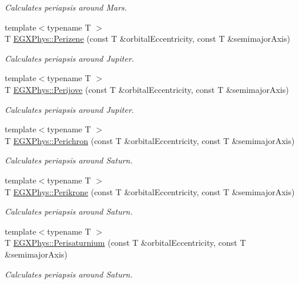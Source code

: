 \begin{DoxyCompactItemize}
\begin{DoxyCompactList}\small\item\em Calculates periapsis around Mars. \end{DoxyCompactList}\item 
{\footnotesize template$<$typename T $>$ }\\T \hyperlink{group___astrophysics_ga0523c65b7fc26e675388b2c3d38aa00b}{E\+G\+X\+Phys\+::\+Perizene} (const T \&orbital\+Eccentricity, const T \&semimajor\+Axis)
\begin{DoxyCompactList}\small\item\em Calculates periapsis around Jupiter. \end{DoxyCompactList}\item 
{\footnotesize template$<$typename T $>$ }\\T \hyperlink{group___astrophysics_ga075052f7ff9aa1d5fdf4501b493be86b}{E\+G\+X\+Phys\+::\+Perijove} (const T \&orbital\+Eccentricity, const T \&semimajor\+Axis)
\begin{DoxyCompactList}\small\item\em Calculates periapsis around Jupiter. \end{DoxyCompactList}\item 
{\footnotesize template$<$typename T $>$ }\\T \hyperlink{group___astrophysics_ga12b5e99aa2e3e7031ef6ce93060cf516}{E\+G\+X\+Phys\+::\+Perichron} (const T \&orbital\+Eccentricity, const T \&semimajor\+Axis)
\begin{DoxyCompactList}\small\item\em Calculates periapsis around Saturn. \end{DoxyCompactList}\item 
{\footnotesize template$<$typename T $>$ }\\T \hyperlink{group___astrophysics_gaa56f74c44a3583b8f0d13b821c1d7422}{E\+G\+X\+Phys\+::\+Perikrone} (const T \&orbital\+Eccentricity, const T \&semimajor\+Axis)
\begin{DoxyCompactList}\small\item\em Calculates periapsis around Saturn. \end{DoxyCompactList}\item 
{\footnotesize template$<$typename T $>$ }\\T \hyperlink{group___astrophysics_ga60a50d09d29ebe47cbbfc125c2ea42bf}{E\+G\+X\+Phys\+::\+Perisaturnium} (const T \&orbital\+Eccentricity, const T \&semimajor\+Axis)
\begin{DoxyCompactList}\small\item\em Calculates periapsis around Saturn. \end{DoxyCompactList}\item 

\end{DoxyCompactItemize}
